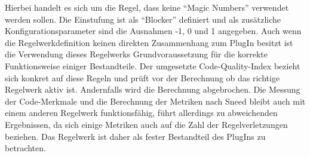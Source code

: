 \documentclass[da,ngerman]{stthesis}
\begin{document}
			Hierbei handelt es sich um die Regel, dass keine "`Magic Numbers"' verwendet werden sollen. Die Einstufung ist als "`Blocker"' definiert und als zusätzliche Konfigurationsparameter sind die Ausnahmen -1, 0 und 1 angegeben. \newline
			Auch wenn die Regelwerkdefinition keinen direkten Zusammenhang zum PlugIn besitzt ist die Verwendung dieses Regelwerks Grundvoraussetzung für die korrekte Funktionsweise einiger Bestandteile. Der umgesetzte Code-Quality-Index bezieht sich konkret auf diese Regeln und prüft vor der Berechnung ob das richtige Regelwerk aktiv ist. Andernfalls wird die Berechnung abgebrochen. Die Messung der Code-Merkmale und die Berechnung der Metriken nach Sneed bleibt auch mit einem anderen Regelwerk funktionsfähig, führt allerdings zu abweichenden Ergebnissen, da sich einige Metriken auch auf die Zahl der Regelverletzungen beziehen. Das Regelwerk ist daher als fester Bestandteil des PlugIns zu betrachten.
\end{document}
